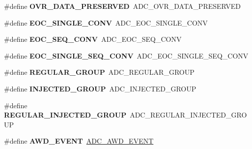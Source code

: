\begin{DoxyCompactItemize}
\#define {\bfseries O\+V\+R\+\_\+\+D\+A\+T\+A\+\_\+\+P\+R\+E\+S\+E\+R\+V\+ED}~A\+D\+C\+\_\+\+O\+V\+R\+\_\+\+D\+A\+T\+A\+\_\+\+P\+R\+E\+S\+E\+R\+V\+ED
\item 
\mbox{\label{group___h_a_l___a_d_c___aliased___defines_ga8160cf13a85d797ef96972174a863945}} 
\#define {\bfseries E\+O\+C\+\_\+\+S\+I\+N\+G\+L\+E\+\_\+\+C\+O\+NV}~A\+D\+C\+\_\+\+E\+O\+C\+\_\+\+S\+I\+N\+G\+L\+E\+\_\+\+C\+O\+NV
\item 
\mbox{\label{group___h_a_l___a_d_c___aliased___defines_gac7022f73c8906a37c7faf511bc720dda}} 
\#define {\bfseries E\+O\+C\+\_\+\+S\+E\+Q\+\_\+\+C\+O\+NV}~A\+D\+C\+\_\+\+E\+O\+C\+\_\+\+S\+E\+Q\+\_\+\+C\+O\+NV
\item 
\mbox{\label{group___h_a_l___a_d_c___aliased___defines_ga503236c97697e9135a9d1c2c88cac7c9}} 
\#define {\bfseries E\+O\+C\+\_\+\+S\+I\+N\+G\+L\+E\+\_\+\+S\+E\+Q\+\_\+\+C\+O\+NV}~A\+D\+C\+\_\+\+E\+O\+C\+\_\+\+S\+I\+N\+G\+L\+E\+\_\+\+S\+E\+Q\+\_\+\+C\+O\+NV
\item 
\mbox{\label{group___h_a_l___a_d_c___aliased___defines_ga37bac62f24a8600f62d0d35683a0a4de}} 
\#define {\bfseries R\+E\+G\+U\+L\+A\+R\+\_\+\+G\+R\+O\+UP}~A\+D\+C\+\_\+\+R\+E\+G\+U\+L\+A\+R\+\_\+\+G\+R\+O\+UP
\item 
\mbox{\label{group___h_a_l___a_d_c___aliased___defines_gaa5d1cfe7b35cb724d898622cbd6b7894}} 
\#define {\bfseries I\+N\+J\+E\+C\+T\+E\+D\+\_\+\+G\+R\+O\+UP}~A\+D\+C\+\_\+\+I\+N\+J\+E\+C\+T\+E\+D\+\_\+\+G\+R\+O\+UP
\item 
\mbox{\label{group___h_a_l___a_d_c___aliased___defines_ga1e691aaec563e444d3965d5d98d1c47b}} 
\#define {\bfseries R\+E\+G\+U\+L\+A\+R\+\_\+\+I\+N\+J\+E\+C\+T\+E\+D\+\_\+\+G\+R\+O\+UP}~A\+D\+C\+\_\+\+R\+E\+G\+U\+L\+A\+R\+\_\+\+I\+N\+J\+E\+C\+T\+E\+D\+\_\+\+G\+R\+O\+UP
\item 
\mbox{\label{group___h_a_l___a_d_c___aliased___defines_ga21fdc6d3f5ae5c030acc0f5518fbea4a}} 
\#define {\bfseries A\+W\+D\+\_\+\+E\+V\+E\+NT}~\hyperlink{group___a_d_c___event__type_ga2d1d545ea1bfecba7a7081be6ef2cb93}{A\+D\+C\+\_\+\+A\+W\+D\+\_\+\+E\+V\+E\+NT}

\end{DoxyCompactItemize}
